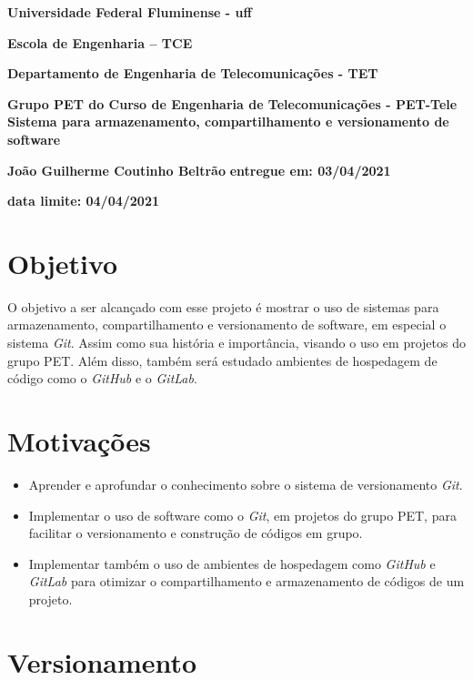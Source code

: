 \documentclass{article}
\title{}
\date{}
\begin{document}
\maketitle
\begin{center}
\textbf{Universidade Federal Fluminense - uff}

\textbf{Escola de Engenharia – TCE }

\textbf{Departamento de Engenharia de Telecomunicações - TET }

\textbf{Grupo PET do Curso de Engenharia de Telecomunicações - PET-Tele }
\vfill
\textbf{\huge Sistema para armazenamento, compartilhamento e versionamento de software}

\vfill
\textbf{\Large João Guilherme Coutinho Beltrão }
\vfill
\textbf{entregue em: 03/04/2021}

\textbf{ data limite: 04/04/2021}
\vfill
\newpage
\end{center}


\section{Objetivo}

\hspace{4mm} O objetivo a ser alcançado com esse projeto é mostrar o uso de sistemas para armazenamento, compartilhamento e versionamento de software, em especial o sistema \textit{Git}. Assim como sua história e importância, visando o uso em projetos do grupo PET. Além disso, também será estudado ambientes de hospedagem de código como o \textit{GitHub} e o \textit{GitLab}.

\section{Motivações}
\begin{itemize}
    \item Aprender e aprofundar o conhecimento sobre o sistema de versionamento \textit{Git}.
    \item Implementar o uso de software como o \textit{Git}, em projetos do grupo PET, para facilitar o versionamento e construção de códigos em grupo.
    \item Implementar também o uso de ambientes de hospedagem como \textit{GitHub} e \textit{GitLab} para otimizar o compartilhamento e armazenamento de códigos de um projeto.
\end{itemize}

\section{Versionamento}
\end{document}
